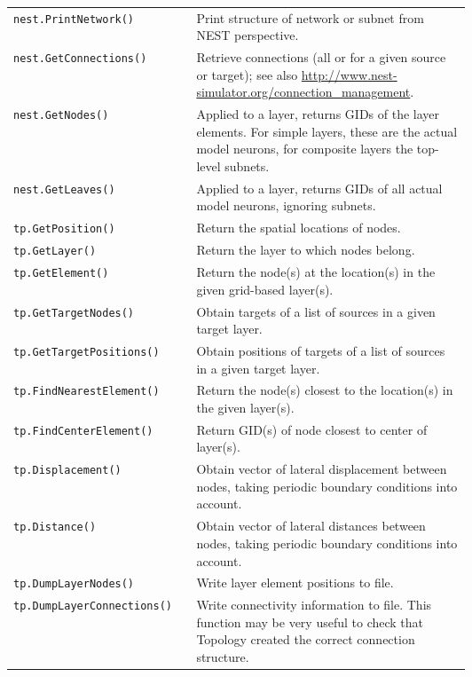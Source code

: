 \documentclass[a4paper,12pt]{report}
\begin{document}
\renewcommand{\arraystretch}{1.2}
\begin{longtable}{lp{0.6\linewidth}}
  \lstinline!nest.PrintNetwork()! & Print structure of network or
  subnet
  from NEST perspective. \\
  \lstinline!nest.GetConnections()! & Retrieve connections
  (all or for a given source or target); see also
  \url{http://www.nest-simulator.org/connection_management}. \\
  \lstinline!nest.GetNodes()! & Applied to a layer, returns GIDs of
  the layer elements. For simple layers, these are the actual model
  neurons,
  for composite layers the top-level subnets.\\
  \lstinline!nest.GetLeaves()! & Applied to a layer, returns GIDs of
  all
  actual model neurons, ignoring subnets.\\
  \lstinline!tp.GetPosition()!  &
  Return the spatial locations of nodes.\\
  \lstinline!tp.GetLayer()!  &
  Return the layer to which nodes belong.\\
  \lstinline!tp.GetElement()!  &
  Return the node(s) at the location(s) in the given grid-based layer(s).\\
  \lstinline!tp.GetTargetNodes()!  &
  Obtain targets of a list of sources in a given target layer.\\
  \lstinline!tp.GetTargetPositions()!  &
  Obtain positions of targets of a list of sources in a given target layer.\\
  \lstinline!tp.FindNearestElement()!  & Return the node(s) closest to
  the location(s) in the given
  layer(s).\\
  \lstinline!tp.FindCenterElement()!  &
  Return GID(s) of node closest to center of layer(s).\\
  \lstinline!tp.Displacement()!  & Obtain vector of lateral
  displacement between nodes, taking
  periodic boundary conditions into account. \\
  \lstinline!tp.Distance()!  & Obtain vector of lateral distances
  between nodes, taking periodic
  boundary conditions into account.\\
  \lstinline!tp.DumpLayerNodes()!  &
  Write layer element positions to file.\\
  \lstinline!tp.DumpLayerConnections()!  & Write connectivity
  information to file. This function may be very useful to check that
  Topology created the correct connection structure.
\end{longtable}
\end{document}
